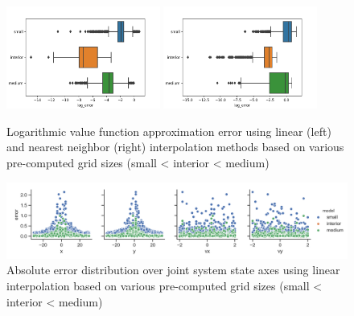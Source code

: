 \begin{figure}[!ht]
\begin{center}
\includegraphics[width=0.45\textwidth]{images/hj_bar_linear.png}
\includegraphics[width=0.45\textwidth]{images/hj_bar_nearest.png}
\caption{Logarithmic value function approximation error using linear (left) and nearest neighbor (right) interpolation methods based on various pre-computed grid sizes (small < interior < medium)}
\label{img:hj_approx_bar}
\end{center}
\end{figure}

\begin{figure}[!ht]
\begin{center}
\includegraphics[width=\imgwidth]{images/hj_hist_linear.png}
\caption{Absolute error distribution over joint system state axes using linear interpolation based on various pre-computed grid sizes (small < interior < medium)}
\label{img:hj_approx_hist}
\end{center}
\end{figure}

